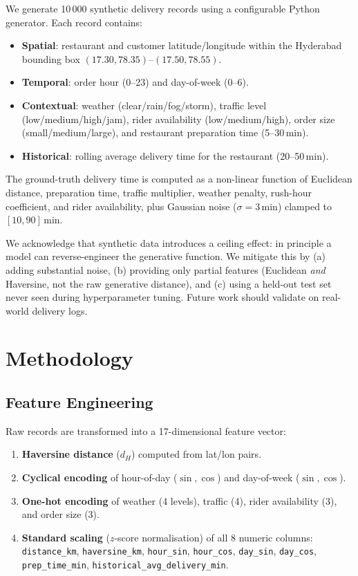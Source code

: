 \documentclass[conference]{IEEEtran}
\begin{document}
We generate 10\,000 synthetic delivery records using a configurable
Python generator.  Each record contains:

\begin{itemize}
    \item \textbf{Spatial}: restaurant and customer latitude/longitude within
          the Hyderabad bounding box $(17.30,78.35)$--$(17.50,78.55)$.
    \item \textbf{Temporal}: order hour (0–23) and day-of-week (0–6).
    \item \textbf{Contextual}: weather (clear/rain/fog/storm), traffic level
          (low/medium/high/jam), rider availability (low/medium/high), order
          size (small/medium/large), and restaurant preparation time (5–30\,min).
    \item \textbf{Historical}: rolling average delivery time for the restaurant
          (20–50\,min).
\end{itemize}

The ground-truth delivery time is computed as a non-linear function of
Euclidean distance, preparation time, traffic multiplier, weather penalty,
rush-hour coefficient, and rider availability, plus Gaussian noise
($\sigma = 3$\,min) clamped to $[10, 90]$\,min.

We acknowledge that synthetic data introduces a ceiling effect: in principle a
model can reverse-engineer the generative function.  We mitigate this by
(a) adding substantial noise, (b) providing only partial features
(Euclidean \emph{and} Haversine, not the raw generative distance), and
(c) using a held-out test set never seen during hyperparameter tuning.
Future work should validate on real-world delivery logs.

\section{Methodology}
\label{sec:method}

\subsection{Feature Engineering}
\label{sec:features}

Raw records are transformed into a 17-dimensional feature vector:
\begin{enumerate}
    \item \textbf{Haversine distance} ($d_H$) computed from lat/lon pairs.
    \item \textbf{Cyclical encoding} of hour-of-day ($\sin,\cos$) and
          day-of-week ($\sin,\cos$).
    \item \textbf{One-hot encoding} of weather (4 levels), traffic (4),
          rider availability (3), and order size (3).
    \item \textbf{Standard scaling} ($z$-score normalisation) of all 8 numeric
          columns: \texttt{distance\_km}, \texttt{haversine\_km},
          \texttt{hour\_sin}, \texttt{hour\_cos}, \texttt{day\_sin},
          \texttt{day\_cos}, \texttt{prep\_time\_min},
          \texttt{historical\_avg\_delivery\_min}.
\end{enumerate}
\end{document}
